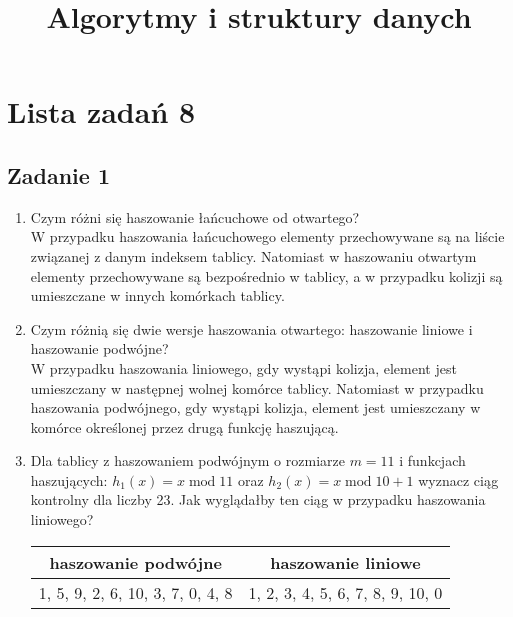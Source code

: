 \documentclass{article}
\begin{document}
\title{Algorytmy i struktury danych}
\author{}
\date{}
\maketitle

\section*{Lista zadań 8}

\subsection*{Zadanie 1}
\begin{enumerate}[label=(\alph*)]
	\item Czym różni się haszowanie łańcuchowe od otwartego? \\[1ex]
	      W przypadku haszowania łańcuchowego elementy przechowywane są na liście związanej z danym indeksem tablicy.
	      Natomiast w haszowaniu otwartym elementy przechowywane są bezpośrednio w tablicy, a w przypadku kolizji
	      są umieszczane w innych komórkach tablicy.
	\item Czym różnią się dwie wersje haszowania otwartego: haszowanie liniowe i haszowanie podwójne? \\[1ex]
	      W przypadku haszowania liniowego, gdy wystąpi kolizja, element jest umieszczany w następnej wolnej komórce
	      tablicy. Natomiast w przypadku haszowania podwójnego, gdy wystąpi kolizja, element jest umieszczany w komórce
	      określonej przez drugą funkcję haszującą.
	\item Dla tablicy z haszowaniem podwójnym o rozmiarze $m=11$ i funkcjach haszujących:
	      $h_1(x)=x \mathop{\mathrm{mod}} 11$  oraz $h_2(x)= x \mathop{\mathrm{mod}} 10+1$ wyznacz ciąg kontrolny
	      dla liczby 23. Jak wyglądałby ten ciąg w przypadku haszowania liniowego?
	      \begin{center}
		      \begin{tabular}{c | c}
			      \textbf{haszowanie podwójne}     & \textbf{haszowanie liniowe}      \\
			      \hline
			      1, 5, 9, 2, 6, 10, 3, 7, 0, 4, 8 & 1, 2, 3, 4, 5, 6, 7, 8, 9, 10, 0
		      \end{tabular}
	      \end{center}
\end{enumerate}
\end{document}
